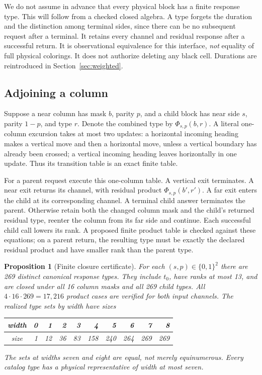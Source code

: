\documentclass[11pt]{article}
\newtheorem{proposition}[theorem]{Proposition}
\theoremstyle{definition}\newtheorem{definition}[theorem]{Definition}
\begin{document}
We do not assume in advance that every physical block has a finite response
type. This will follow from a checked closed algebra. A type forgets the duration
and the distinction among terminal sides, since there can be no subsequent
request after a terminal. It retains every channel and residual response after
a successful return. It is observational equivalence for this interface,
\emph{not} equality of full physical colorings. It does not authorize deleting
any black cell. Durations are reintroduced in Section~\ref{sec:weighted}.

\subsection{Adjoining a column}
Suppose a near column has mask $b$, parity $p$, and a child block has near side
$s$, parity $1-p$, and type $r$. Denote the combined type by
$\Phi_{s,p}(b,r)$.
A literal one-column excursion takes at most two updates: a horizontal incoming
heading makes a vertical move and then a horizontal move, unless a vertical
boundary has already been crossed; a vertical incoming heading leaves
horizontally in one update. Thus its transition table is an exact finite table.

For a parent request execute this one-column table. A vertical exit terminates.
A near exit returns its channel, with residual product
$\Phi_{s,p}(b',r')$. A far exit enters the child at its corresponding channel.
A terminal child answer terminates the parent. Otherwise retain both the changed
column mask and the child's returned residual type, reenter the column from its
far side and continue. Each successful child call lowers its rank. A proposed
finite product table is checked against these equations; on a parent return,
the resulting type must be exactly the declared residual product and have
smaller rank than the parent type.

\begin{proposition}[Finite closure certificate]\label{prop:catalog}
For each $(s,p)\in\{0,1\}^2$ there are 269 distinct canonical response types.
They include $t_0$, have ranks at most 13, and are closed under all 16 column
masks and all 269 child types. All $4\cdot16\cdot269=17,216$ product cases are
verified for both input channels. The realized type sets by width have sizes
\begin{center}
\begin{tabular}{c|rrrrrrrrr}
width&0&1&2&3&4&5&6&7&8\\\hline
size&1&12&36&83&158&240&264&269&269
\end{tabular}
\end{center}
The sets at widths seven and eight are equal, not merely equinumerous.
Every catalog type has a physical representative of width at most seven.
\end{proposition}
\end{document}
